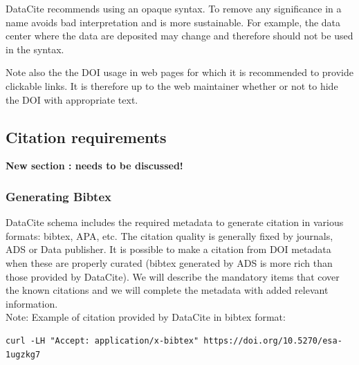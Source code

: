 \documentclass[11pt,a4paper]{ivoa}
\begin{document}
DataCite recommends using an opaque syntax. To remove any significance
in a name avoids bad interpretation and is more sustainable. For example,
the data center where the data are deposited may change and therefore
should not be used in the syntax.

Note also the the DOI usage in web pages for which it is recommended to provide clickable links. It is therefore up to the web maintainer whether or not to hide the DOI with appropriate text.

\subsection{Citation requirements}
\label{sec:citation}
\textbf{\color{red} New section : needs to be discussed!}


\subsubsection{Generating Bibtex}
DataCite schema includes the required metadata to generate citation in various formats: bibtex, APA, etc. The citation quality is generally fixed by journals, ADS or Data publisher. It is possible to make a citation from DOI metadata when these are properly curated (bibtex generated by ADS is more rich than those provided by DataCite). 
We will describe the mandatory items that cover the known citations and we will complete the metadata with added relevant information.\\


Note: Example of citation provided by DataCite in bibtex format:

\begin{verbatim}
curl -LH "Accept: application/x-bibtex" https://doi.org/10.5270/esa-1ugzkg7
\end{verbatim}
\end{document}
